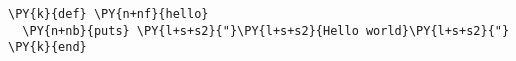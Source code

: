 \begin{Verbatim}[commandchars=\\\{\}]
\PY{k}{def} \PY{n+nf}{hello}
  \PY{n+nb}{puts} \PY{l+s+s2}{"}\PY{l+s+s2}{Hello world}\PY{l+s+s2}{"}
\PY{k}{end}
\end{Verbatim}
